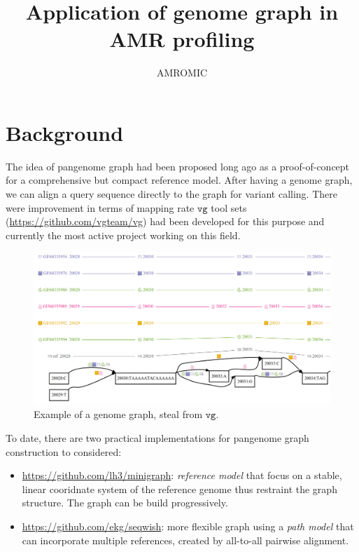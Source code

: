 \documentclass[10pt,twocolumn,twoside]{genpaper}
\title{Application of genome graph in AMR profiling}
\author[1,$\ast$]{AMROMIC}
\affil[1]{Vietnam-Australia-USA}
\newcommand{\vg}{$\mathtt{vg}$}
\begin{document}
\maketitle
\thispagestyle{fancy}

\section*{Background}
The idea of pangenome graph had been proposed long ago as a proof-of-concept for a comprehensive but compact reference model. After having a genome graph, we can align a query sequence directly to the graph for variant calling. There were improvement in terms of mapping rate \vg{} tool sets (\url{https://github.com/vgteam/vg}) had been developed for this purpose and currently the most active project working on this field. 

\begin{figure}[!hpt]
\centering
\caption{Example of a genome graph, steal from \vg{}.}
\includegraphics[width=.9\textwidth]{images/smallgraph.png}
\end{figure}

To date, there are two practical implementations for pangenome graph construction to considered:
\begin{itemize}
\item \url{https://github.com/lh3/minigraph}: \emph{reference model} that focus on a stable, linear cooridnate system of the reference genome thus restraint the graph structure. The graph can be build progressively.
\item \url{https://github.com/ekg/seqwish}: more flexible graph using a \emph{path model} that can incorporate multiple references, created by all-to-all pairwise alignment.
\end{itemize}
\end{document}
